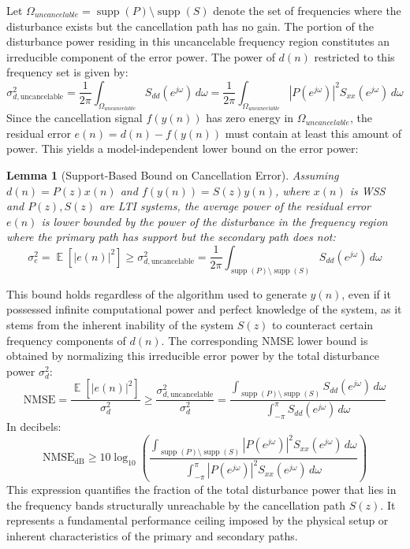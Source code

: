 \documentclass{article}
\DeclareMathOperator{\E}{\mathbb{E}} %
\newtheorem{lemma}{Lemma}
\begin{document}
Let \( \Omega_{uncancelable} = \operatorname{supp}(P) \setminus \operatorname{supp}(S) \) denote the set of frequencies where the disturbance exists but the cancellation path has no gain. The portion of the disturbance power residing in this uncancelable frequency region constitutes an irreducible component of the error power. The power of \( d(n) \) restricted to this frequency set is given by:
\begin{equation}
\sigma_{d, \text{uncancelable}}^2 = \frac{1}{2\pi} \int_{\Omega_{uncancelable}} S_{dd}(e^{j\omega}) \, d\omega = \frac{1}{2\pi} \int_{\Omega_{uncancelable}} |P(e^{j\omega})|^2 S_{xx}(e^{j\omega}) \, d\omega
\end{equation}
Since the cancellation signal \( f(y(n)) \) has zero energy in \( \Omega_{uncancelable} \), the residual error \( e(n) = d(n) - f(y(n)) \) must contain at least this amount of power. This yields a model-independent lower bound on the error power:

\begin{lemma}[Support-Based Bound on Cancellation Error]
Assuming \( d(n) = P(z)x(n) \) and \( f(y(n)) = S(z)y(n) \), where \( x(n) \) is WSS and \( P(z), S(z) \) are LTI systems, the average power of the residual error \( e(n) \) is lower bounded by the power of the disturbance in the frequency region where the primary path has support but the secondary path does not:
\begin{equation}
\sigma_e^2 = \E[|e(n)|^2] \geq \sigma_{d, \text{uncancelable}}^2 = \frac{1}{2\pi} \int_{\operatorname{supp}(P) \setminus \operatorname{supp}(S)} S_{dd}(e^{j\omega}) \, d\omega
\label{eq:support_bound_raw}
\end{equation}
\end{lemma}
This bound holds regardless of the algorithm used to generate \( y(n) \), even if it possessed infinite computational power and perfect knowledge of the system, as it stems from the inherent inability of the system \( S(z) \) to counteract certain frequency components of \( d(n) \). The corresponding NMSE lower bound is obtained by normalizing this irreducible error power by the total disturbance power \( \sigma_d^2 \):
\begin{equation}
\mathrm{NMSE} = \frac{\E[|e(n)|^2]}{\sigma_d^2} \geq \frac{\sigma_{d, \text{uncancelable}}^2}{\sigma_d^2} = \frac{\int_{\operatorname{supp}(P) \setminus \operatorname{supp}(S)} S_{dd}(e^{j\omega}) \, d\omega}{\int_{-\pi}^{\pi} S_{dd}(e^{j\omega}) \, d\omega}
\end{equation}
In decibels:
\begin{equation}
\mathrm{NMSE}_{\mathrm{dB}} \geq 10 \log_{10} \left( \frac{\int_{\operatorname{supp}(P) \setminus \operatorname{supp}(S)} |P(e^{j\omega})|^2 S_{xx}(e^{j\omega}) \, d\omega}{\int_{-\pi}^{\pi} |P(e^{j\omega})|^2 S_{xx}(e^{j\omega}) \, d\omega} \right)
\label{eq:support-nmse_elaborated}
\end{equation}
This expression quantifies the fraction of the total disturbance power that lies in the frequency bands structurally unreachable by the cancellation path \( S(z) \). It represents a fundamental performance ceiling imposed by the physical setup or inherent characteristics of the primary and secondary paths.
\end{document}
